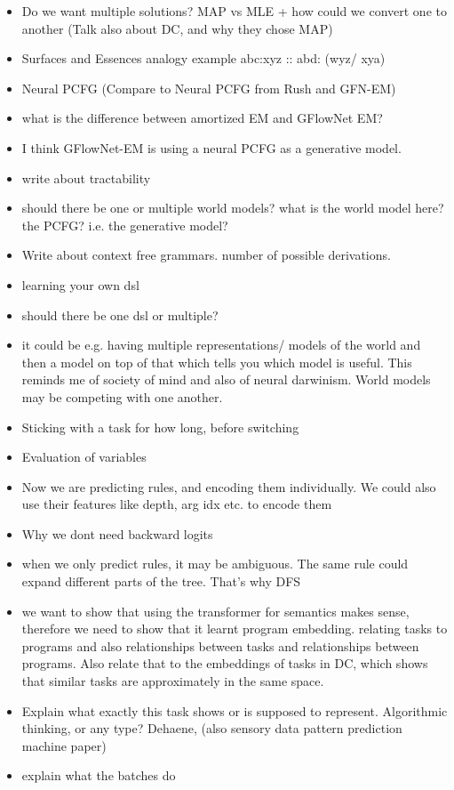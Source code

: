 \begin{itemize}
    \item Do we want multiple solutions? MAP vs MLE + how could we convert one to another (Talk also about DC, and why they chose MAP)
    \item Surfaces and Essences analogy example abc:xyz :: abd: (wyz/ xya) 
    \item Neural PCFG (Compare to Neural PCFG from Rush and GFN-EM)
    \item what is the difference between amortized EM and GFlowNet EM?
    \item I think GFlowNet-EM is using a neural PCFG as a generative model. 
    \item write about tractability
    \item should there be one or multiple world models?  what is the world model here? the PCFG? i.e. the generative model? 
    \item Write about context free grammars. number of possible derivations.
    \item learning your own dsl
    \item should there be one dsl or multiple?
    \item it could be e.g. having multiple representations/ models of the world and then a model on top of that which tells you which model is useful. This reminds me of society of mind and also of neural darwinism. World models may be competing with one another. 
    \item Sticking with a task for how long, before switching
    \item Evaluation of variables
    \item Now we are predicting rules, and encoding them individually. We could also use their features like depth, arg idx etc. to encode them 
    \item Why we dont need backward logits
    \item when we only predict rules, it may be ambiguous. The same rule could expand different parts of the tree. That's why DFS
    \item we want to show that using the transformer for semantics makes sense, therefore we need to show that it learnt program embedding. relating tasks to programs and also relationships between tasks and relationships between programs. Also relate that to the embeddings of tasks in DC, which shows that similar tasks are approximately in the same space.
    \item Explain what exactly this task shows or is supposed to represent. Algorithmic thinking, or any type? Dehaene, (also sensory data pattern prediction machine paper)
    \item explain what the batches do
\end{itemize}





